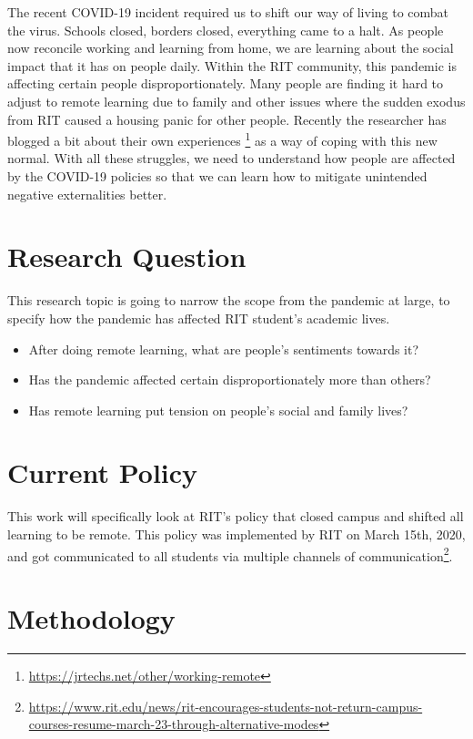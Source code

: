 \documentclass[12pt,
 reprint,
nofootinbib,
 amsmath,amssymb,
 aps,
floatfix,
]{revtex4-2}
\begin{document}
The recent COVID-19 incident required us to shift our way of living to combat the virus. Schools closed, borders closed, everything came to a halt\cite{covid}. As people now reconcile working and learning from home, we are learning about the social impact that it has on people daily. Within the RIT community, this pandemic is affecting certain people disproportionately. Many people are finding it hard to adjust to remote learning due to family and other issues where the sudden exodus from RIT caused a housing panic for other people. Recently the researcher has blogged a bit about their own experiences \footnote{\url{https://jrtechs.net/other/working-remote}} as a way of coping with this new normal. With all these struggles, we need to understand how people are affected by the COVID-19 policies so that we can learn how to mitigate unintended negative externalities better. 

\section{Research Question}

This research topic is going to narrow the scope from the pandemic at large, to specify how the pandemic has affected RIT student's academic lives.

\begin{itemize}
    \item After doing remote learning, what are people's sentiments towards it?
    \item Has the pandemic affected certain disproportionately more than others?
    \item Has remote learning put tension on people's social and family lives?
\end{itemize}

\section{Current Policy}

This work will specifically look at RIT's policy that closed campus and shifted all learning to be remote. This policy was implemented by RIT on March 15th, 2020, and got communicated to all students via multiple channels of communication\footnote{\url{https://www.rit.edu/news/rit-encourages-students-not-return-campus-courses-resume-march-23-through-alternative-modes}}.

\section{Methodology}
\end{document}
